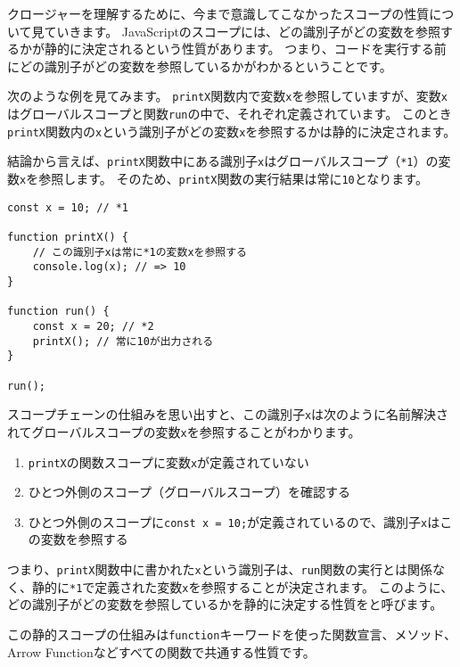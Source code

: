 クロージャーを理解するために、今まで意識してこなかったスコープの性質について見ていきます。
JavaScriptのスコープには、どの識別子がどの変数を参照するかが静的に決定されるという性質があります。
つまり、コードを実行する前にどの識別子がどの変数を参照しているかがわかるということです。

次のような例を見てみます。
\texttt{printX}関数内で変数\texttt{x}を参照していますが、変数\texttt{x}はグローバルスコープと関数\texttt{run}の中で、それぞれ定義されています。
このとき\texttt{printX}関数内の\texttt{x}という識別子がどの変数\texttt{x}を参照するかは静的に決定されます。

結論から言えば、\texttt{printX}関数中にある識別子\texttt{x}はグローバルスコープ（\texttt{*1}）の変数\texttt{x}を参照します。
そのため、\texttt{printX}関数の実行結果は常に\texttt{10}となります。

\begin{lstlisting}
const x = 10; // *1

function printX() {
    // この識別子xは常に*1の変数xを参照する
    console.log(x); // => 10
}

function run() {
    const x = 20; // *2
    printX(); // 常に10が出力される
}

run();
\end{lstlisting}

スコープチェーンの仕組みを思い出すと、この識別子\texttt{x}は次のように名前解決されてグローバルスコープの変数\texttt{x}を参照することがわかります。

\begin{enumerate}
\def\labelenumi{\arabic{enumi}.}
\item
  \texttt{printX}の関数スコープに変数\texttt{x}が定義されていない
\item
  ひとつ外側のスコープ（グローバルスコープ）を確認する
\item
  ひとつ外側のスコープに\texttt{const x = 10;}が定義されているので、識別子\texttt{x}はこの変数を参照する
\end{enumerate}

つまり、\texttt{printX}関数中に書かれた\texttt{x}という識別子は、\texttt{run}関数の実行とは関係なく、静的に\texttt{*1}で定義された変数\texttt{x}を参照することが決定されます。
このように、どの識別子がどの変数を参照しているかを静的に決定する性質を\textbf{}と呼びます。

この静的スコープの仕組みは\texttt{function}キーワードを使った関数宣言、メソッド、Arrow
Functionなどすべての関数で共通する性質です。

